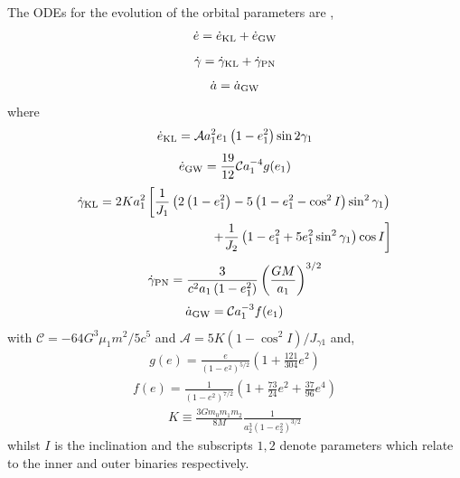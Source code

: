 \documentclass[a4paper,fleqn,usenatbib]{mnras}
\begin{document}
\noindent The ODEs for the evolution of the orbital parameters are \citep{Randall2018},
\begin{eqnarray}
\dot{e} = \dot{e}_{\rm KL} + \dot{e}_{\rm GW}
\label{eq:edot}
\end{eqnarray}
\begin{eqnarray}
\dot{\gamma} = \dot{\gamma}_{\rm KL} + \dot{\gamma}_{\rm PN}
\end{eqnarray}
\begin{eqnarray}
\dot{a} = \dot{a}_{\rm GW} 
\label{eq:gwdot}
\end{eqnarray}
where
\begin{eqnarray}
\dot{e}_{\rm KL} =   \mathcal{A} a_1^2 e_{1}\left(1-e_{1}^{2}\right) \sin 2 \gamma_{1}
\end{eqnarray}
\begin{eqnarray}
\dot{e}_{\rm GW} = \frac{19}{12} \mathcal{C} a_1^{-4} g(e_1)
\end{eqnarray}
\begin{align}
\dot{\gamma}_{\rm KL} = 2 Ka_1^2\left[\frac{1}{J_{1}}\left(2\left(1-e_{1}^{2}\right)-5\left(1-e_{1}^{2}-\cos ^{2} I\right) \sin ^{2} \gamma_{1}\right)\right. \\
\left.+\frac{1}{J_{2}}\left(1-e_{1}^{2}+5 e_{1}^{2} \sin ^{2} \gamma_{1}\right) \cos I\right]
\end{align}
\begin{eqnarray}
\dot{\gamma}_{\rm PN} = \frac{3}{c^{2} a_{1}\left(1-e_{1}^{2}\right)}\left(\frac{G M}{a_{1}}\right)^{3 / 2}
\end{eqnarray}
\begin{eqnarray}
\dot{a}_{\rm GW} = \mathcal{C} a_{1}^{-3} f(e_1)
\end{eqnarray}
with $\mathcal{C} = -64 G^{3} \mu_{1} m^{2} / 5c^5$ and $\mathcal{A} = 5 K \left(1-\cos ^{2} I\right) / J_{\gamma 1}$ and,
\begin{eqnarray}
g(e) = \frac{e}{\left(1-e^{2}\right)^{5 / 2}}\left(1+\frac{121}{304} e^{2} \right)
\end{eqnarray}
\begin{eqnarray}
f(e) = \frac{1}{\left(1-e^{2}\right)^{7 / 2}}\left(1+\frac{73}{24} e^{2}+\frac{37}{96} e^{4}\right)
\end{eqnarray} 
\begin{eqnarray}
K \equiv \frac{3 G m_{0} m_{1} m_{2}}{8 M} \frac{1}{a_{2}^{3}\left(1-e_{2}^{2}\right)^{3 / 2}}
\end{eqnarray}
whilst $I$ is the inclination and the subscripts $1,2$ denote parameters which relate to the inner and outer binaries respectively. \newline 
\end{document}
